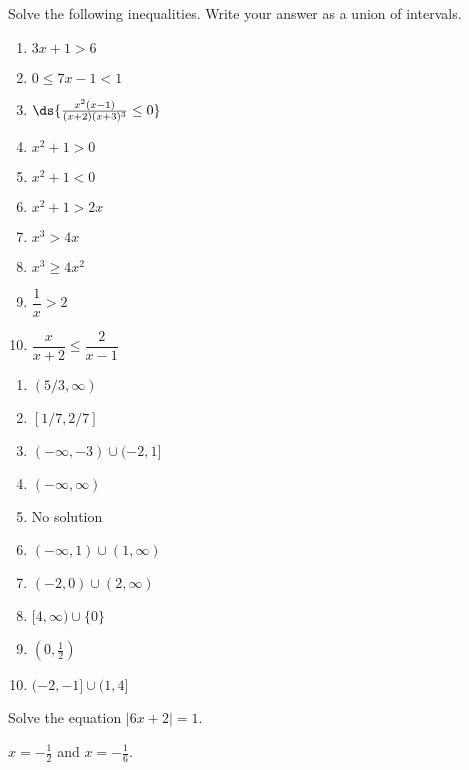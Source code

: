 \begin{enumialphparenastyle}
\begin{ex}
Solve the following inequalities. Write your answer as a union of intervals.
\begin{multicols}{2}
\begin{enumerate}
	\item	$3x+1>6$
	\item	$0\leq 7x-1 < 1$
	\item	$\ds{\frac{x^2(x-1)}{(x+2)(x+3)^3}\leq 0}$
	\item	$x^2+1>0$
	\item	$x^2+1<0$
	\item	$x^2+1>2x$
	\item	$x^3>4x$
	\item	$x^3\geq4x^2$
	\item	$\dfrac{1}{x}>2$
	\item	$\dfrac{x}{x+2}\leq\dfrac{2}{x-1}$
\end{enumerate}
\end{multicols}
\begin{sol}
\begin{enumerate}
	\item	$(5/3,\infty)$
	\item	$[1/7,2/7]$
	\item	$(-\infty,-3)\cup(-2,1]$
	\item	$(-\infty,\infty)$
	\item	No solution
	\item	$(-\infty,1)\cup(1,\infty)$
	\item	$(-2,0)\cup(2,\infty)$
	\item	$[4,\infty)\cup\{0\}$
	\item	$(0,\frac{1}{2})$
	\item	$(-2,-1]\cup(1,4]$
\end{enumerate}
\end{sol}
\end{ex}

\begin{ex}
Solve the equation $|6x+2|=1$.
\begin{sol}
$x=-\frac{1}{2}$ and $x=-\frac{1}{6}$.
\end{sol}
\end{ex}


\end{enumialphparenastyle}
